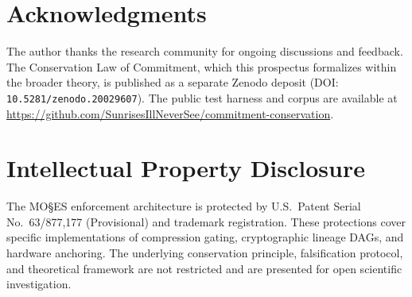 \documentclass[11pt,a4paper]{article}
\begin{document}
\section*{Acknowledgments}

The author thanks the research community for ongoing discussions and feedback. The Conservation Law of Commitment, which this prospectus formalizes within the broader theory, is published as a separate Zenodo deposit (DOI: \texttt{10.5281/zenodo.20029607}). The public test harness and corpus are available at \url{https://github.com/SunrisesIllNeverSee/commitment-conservation}.

\section*{Intellectual Property Disclosure}

The MO\S{}ES\texttrademark{} enforcement architecture is protected by U.S.\ Patent Serial No.\ 63/877,177 (Provisional) and trademark registration. These protections cover specific implementations of compression gating, cryptographic lineage DAGs, and hardware anchoring. The underlying conservation principle, falsification protocol, and theoretical framework are not restricted and are presented for open scientific investigation.
\end{document}
